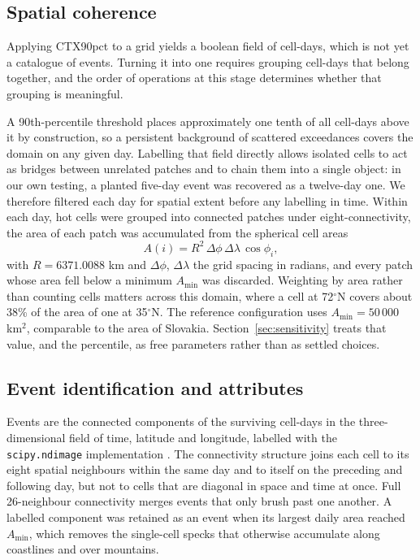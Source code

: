 \documentclass{amsdraft}
\begin{document}
\subsection{Spatial coherence}
\label{sec:coherence}

Applying CTX90pct to a grid yields a boolean field of cell-days, which is not
yet a catalogue of events. Turning it into one requires grouping cell-days
that belong together, and the order of operations at this stage determines
whether that grouping is meaningful.

A 90th-percentile threshold places approximately one tenth of all cell-days
above it by construction, so a persistent background of scattered exceedances
covers the domain on any given day. Labelling that field directly allows
isolated cells to act as bridges between unrelated patches and to chain them
into a single object: in our own testing, a planted five-day event was
recovered as a twelve-day one. We therefore filtered each day for spatial
extent before any labelling in time. Within each day, hot cells were grouped
into connected patches under eight-connectivity, the area of each patch was
accumulated from the spherical cell areas
\begin{equation}
A(i) = R^2 \, \Delta\phi \, \Delta\lambda \, \cos\phi_i ,
\label{eq:area}
\end{equation}
with $R = 6371.0088$ km and $\Delta\phi$, $\Delta\lambda$ the grid spacing in
radians, and every patch whose area fell below a minimum $A_{\min}$ was
discarded. Weighting by area rather than counting cells matters across this
domain, where a cell at 72$^\circ$N covers about 38\% of the area of one at
35$^\circ$N. The reference configuration uses $A_{\min} = 50\,000$ km$^2$,
comparable to the area of Slovakia. Section~\ref{sec:sensitivity} treats that
value, and the percentile, as free parameters rather than as settled choices.

\subsection{Event identification and attributes}
\label{sec:events}

Events are the connected components of the surviving cell-days in the
three-dimensional field of time, latitude and longitude, labelled with the
\texttt{scipy.ndimage} implementation \citep{Virtanen2020}. The connectivity
structure joins each cell to its eight spatial neighbours within the same day
and to itself on the preceding and following day, but not to cells that are
diagonal in space and time at once. Full 26-neighbour connectivity merges
events that only brush past one another. A labelled component was retained as
an event when its largest daily area reached $A_{\min}$, which removes the
single-cell specks that otherwise accumulate along coastlines and over
mountains.
\end{document}
